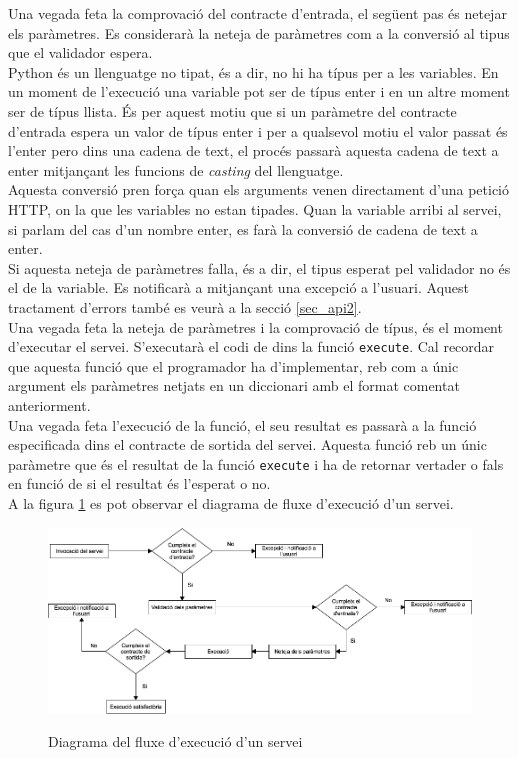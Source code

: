 	Una vegada feta la comprovació del contracte d'entrada, el següent pas és netejar els paràmetres. Es considerarà la neteja de paràmetres com a la conversió al tipus que el validador espera.\\
	
	Python és un llenguatge no tipat, és a dir, no hi ha típus per a les variables. En un moment de l'execució una variable pot ser de típus enter i en un altre moment ser de típus llista. És per aquest motiu que si un paràmetre del contracte d'entrada espera un valor de típus enter i per a qualsevol motiu el valor passat és l'enter pero dins una cadena de text, el procés passarà aquesta cadena de text a enter mitjançant les funcions de \emph{casting} del llenguatge.\\
	
	Aquesta conversió pren força quan els arguments venen directament d'una petició \ac{HTTP}, on la que les variables no estan tipades. Quan la variable arribi al servei, si parlam del cas d'un nombre enter, es farà la conversió de cadena de text a enter. \\
	
	Si aquesta neteja de paràmetres falla, és a dir, el tipus esperat pel validador no és el de la variable. Es notificarà a mitjançant una excepció a l'usuari. Aquest tractament d'errors també es veurà a la secció \ref{sec_api2}.\\

	Una vegada feta la neteja de paràmetres i la comprovació de típus, és el moment d'executar el servei. S'executarà el codi de dins la funció \texttt{execute}. Cal recordar que aquesta funció que el programador ha d'implementar, reb com a únic argument els paràmetres netjats en un diccionari amb el format comentat anteriorment.\\
	
	Una vegada feta l'execució de la funció, el seu resultat es passarà a la funció especificada dins el contracte de sortida del servei. Aquesta funció reb un únic paràmetre que és el resultat de la funció \texttt{execute} i ha de retornar vertader o fals en funció de si el resultat és l'esperat o no.\\
	
	A la figura \ref{fig:fluxe} es pot observar el diagrama de fluxe d'execució d'un servei. 
	
	\begin{figure}[h!]
		\includegraphics[scale=0.35]{img/flux.png}
		\label{fig:fluxe}
		\caption{Diagrama del fluxe d'execució d'un servei}
	\end{figure}
	
